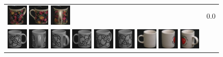\begin{figure}[tbp]
\begin{center}
\begin{tabular}{m{11cm} | m{3cm} |}
\includegraphics[width=1cm]{coil/beeld-63.eps} 
\includegraphics[width=1cm]{coil/beeld-61.eps} 
\includegraphics[width=1cm]{coil/beeld-65.eps} & {\scriptsize 0.0} \\ 
\includegraphics[width=1cm]{coil/beeld-48.eps} 
\includegraphics[width=1cm]{coil/beeld-50.eps} 
\includegraphics[width=1cm]{coil/beeld-49.eps} 
\includegraphics[width=1cm]{coil/beeld-51.eps} 
\includegraphics[width=1cm]{coil/beeld-53.eps} 
\includegraphics[width=1cm]{coil/beeld-52.eps} 
\includegraphics[width=1cm]{coil/beeld-37.eps} 
\includegraphics[width=1cm]{coil/beeld-38.eps} 
\includegraphics[width=1cm]{coil/beeld-40.eps} 

\end{tabular}
\end{center}
\end{figure}

